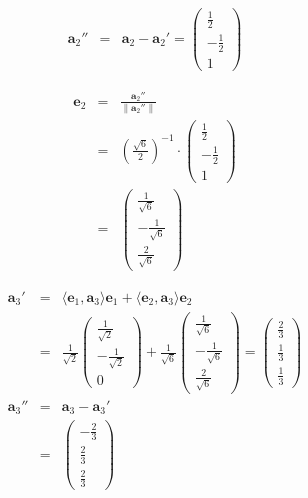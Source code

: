\documentclass[dvipdfmx,autodetect-engine]{jsarticle}
\begin{document}
\begin{eqnarray*}
\bm{a}_2'' &= &\bm{a}_2 - \bm{a}_2' = \begin{pmatrix}
\frac{1}{2} \\[1.5ex]
-\frac{1}{2} \\[1.5ex]
1
\end{pmatrix}
\end{eqnarray*}

\begin{eqnarray*}
\bm{e}_2 &= &\frac{\bm{a}_2''}{\|\bm{a}_2''\|} \\
&=&\left(\frac{\sqrt{6}}{2}\right)^{-1} \cdot \begin{pmatrix}
\frac{1}{2} \\[1.5ex]
-\frac{1}{2} \\[1.5ex]
1
\end{pmatrix} \\
&=&\begin{pmatrix}
\frac{1}{\sqrt{6}} \\[1.5ex]
-\frac{1}{\sqrt{6}} \\[1.5ex]
\frac{2}{\sqrt{6}}
\end{pmatrix}
\end{eqnarray*}

\begin{eqnarray*}
\bm{a}_3' &= &\langle \bm{e}_1, \bm{a}_3 \rangle\bm{e}_1 + \langle \bm{e}_2, \bm{a}_3 \rangle\bm{e}_2 \\
&= & \frac{1}{\sqrt{2}} \begin{pmatrix}
\frac{1}{\sqrt{2}} \\[1.5ex]
-\frac{1}{\sqrt{2}} \\[1.5ex]
0
\end{pmatrix} + \frac{1}{\sqrt{6}}\begin{pmatrix}
\frac{1}{\sqrt{6}} \\[1.5ex]
-\frac{1}{\sqrt{6}} \\[1.5ex]
\frac{2}{\sqrt{6}}
\end{pmatrix} = \begin{pmatrix}
\frac{2}{3} \\[1.5ex]
\frac{1}{3} \\[1.5ex]
\frac{1}{3}
\end{pmatrix} \\
\bm{a}_3'' &=& \bm{a}_3 - \bm{a}_3' \\
&=& \begin{pmatrix}
-\frac{2}{3} \\[1.5ex]
\frac{2}{3} \\[1.5ex]
\frac{2}{3}
\end{pmatrix} \\
\end{eqnarray*}
\end{document}
